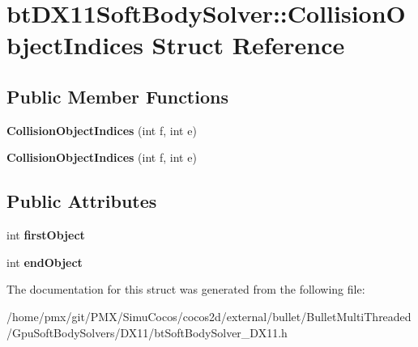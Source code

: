 \hypertarget{structbtDX11SoftBodySolver_1_1CollisionObjectIndices}{}\section{bt\+D\+X11\+Soft\+Body\+Solver\+:\+:Collision\+Object\+Indices Struct Reference}
\label{structbtDX11SoftBodySolver_1_1CollisionObjectIndices}
\subsection*{Public Member Functions}
\begin{DoxyCompactItemize}
\item 
\mbox{\label{structbtDX11SoftBodySolver_1_1CollisionObjectIndices_adaf8bf80b9756917abf96ee553af9058}} 
{\bfseries Collision\+Object\+Indices} (int f, int e)
\item 
\mbox{\label{structbtDX11SoftBodySolver_1_1CollisionObjectIndices_adaf8bf80b9756917abf96ee553af9058}} 
{\bfseries Collision\+Object\+Indices} (int f, int e)
\end{DoxyCompactItemize}
\subsection*{Public Attributes}
\begin{DoxyCompactItemize}
\item 
\mbox{\label{structbtDX11SoftBodySolver_1_1CollisionObjectIndices_a732fc974741e904d2b43457df7712403}} 
int {\bfseries first\+Object}
\item 
\mbox{\label{structbtDX11SoftBodySolver_1_1CollisionObjectIndices_a1341ec63032abdabca34fff029606454}} 
int {\bfseries end\+Object}
\end{DoxyCompactItemize}


The documentation for this struct was generated from the following file\+:\begin{DoxyCompactItemize}
\item 
/home/pmx/git/\+P\+M\+X/\+Simu\+Cocos/cocos2d/external/bullet/\+Bullet\+Multi\+Threaded/\+Gpu\+Soft\+Body\+Solvers/\+D\+X11/bt\+Soft\+Body\+Solver\+\_\+\+D\+X11.\+h\end{DoxyCompactItemize}
